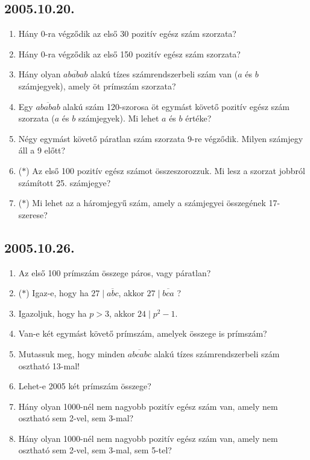 \documentclass{article}
\begin{document}
\subsection*{2005.10.20.}
\begin{enumerate}
\item Hány 0-ra végződik az első 30 pozitív egész szám szorzata?

\item Hány 0-ra végződik az első 150 pozitív egész szám szorzata?

\item Hány olyan $\overline{ababab}$ alakú tízes számrendszerbeli szám van ($a$ és $b$ számjegyek), amely öt prímszám szorzata?

\item Egy $\overline{ababab}$ alakú szám 120-szorosa öt egymást követő pozitív egész szám szorzata ($a$ és $b$ számjegyek). Mi lehet $a$ és $b$ értéke?

\item Négy egymást követő páratlan szám szorzata 9-re végződik. Milyen számjegy áll a 9 előtt?

\item ($*$) Az első 100 pozitív egész számot összeszorozzuk. Mi lesz a szorzat jobbról számított 25. számjegye?

\item ($*$) Mi lehet az a háromjegyű szám, amely a számjegyei összegének 17-szerese?
\end{enumerate}

\subsection*{2005.10.26.}
\begin{enumerate}
\item Az első 100 prímszám összege páros, vagy páratlan?

\item ($*$) Igaz-e, hogy ha $27 \mid \overline{abc}$, akkor $27 \mid \overline{bca}$ ?

\item Igazoljuk, hogy ha $p>3$, akkor $24 \mid p^2-1$. 

\item Van-e két egymást követő prímszám, amelyek összege is prímszám?

\item Mutassuk meg, hogy minden $\overline{abcabc}$ alakú tízes számrendszerbeli szám osztható 13-mal!

\item Lehet-e 2005 két prímszám összege?

\item Hány olyan 1000-nél nem nagyobb pozitív egész szám van, amely nem osztható sem 2-vel, sem 3-mal?

\item Hány olyan 1000-nél nem nagyobb pozitív egész szám van, amely nem osztható sem 2-vel, sem 3-mal, sem 5-tel?

\end{enumerate}
\end{document}
